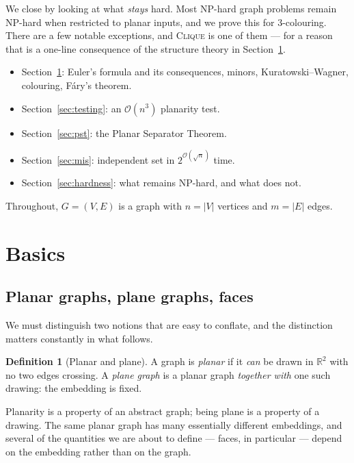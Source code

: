 \documentclass[11pt,a4paper]{article}
\theoremstyle{plain}
\theoremstyle{definition}
\newtheorem{definition}[theorem]{Definition}
\theoremstyle{remark}
\newcommand{\bigoh}[1]{\mathcal{O}\!\left(#1\right)}
\newcommand{\RR}{\mathbb{R}}
\begin{document}
We close by looking at what \emph{stays} hard. Most NP-hard graph problems
remain NP-hard when restricted to planar inputs, and we prove this for
$3$-colouring. There are a few notable exceptions, and \textsc{Clique} is one
of them --- for a reason that is a one-line consequence of the structure theory
in Section~\ref{sec:basics}.

\begin{itemize}[nosep]
  \item Section~\ref{sec:basics}: Euler's formula and its consequences, minors,
        Kuratowski--Wagner, colouring, Fáry's theorem.
  \item Section~\ref{sec:testing}: an $\bigoh{n^3}$ planarity test.
  \item Section~\ref{sec:pst}: the Planar Separator Theorem.
  \item Section~\ref{sec:mis}: independent set in $2^{\bigoh{\sqrt n}}$ time.
  \item Section~\ref{sec:hardness}: what remains NP-hard, and what does not.
\end{itemize}

Throughout, $G = (V,E)$ is a graph with $n = |V|$ vertices and $m = |E|$ edges.

\section{Basics}\label{sec:basics}

\subsection{Planar graphs, plane graphs, faces}

We must distinguish two notions that are easy to conflate, and the distinction
matters constantly in what follows.

\begin{definition}[Planar and plane]
A graph is \emph{planar} if it \emph{can} be drawn in $\RR^2$ with no two edges
crossing. A \emph{plane graph} is a planar graph \emph{together with} one such
drawing: the embedding is fixed.
\end{definition}

Planarity is a property of an abstract graph; being plane is a property of a
drawing. The same planar graph has many essentially different embeddings, and
several of the quantities we are about to define --- faces, in particular ---
depend on the embedding rather than on the graph.
\end{document}
